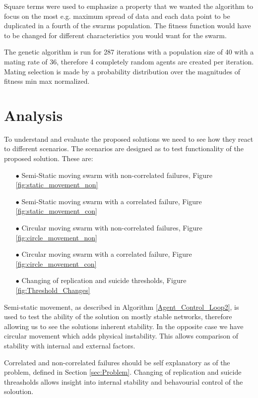 \documentclass{UoYCSproject}
\begin{document}
Square terms were used to emphasize a property that we wanted the algorithm to focus on the most e.g. maximum spread of data and each data point to be duplicated in a fourth of the swarms population. The fitness function would have to be changed for different characteristics you would want for the swarm.

The genetic algorithm is run for 287 iterations with a population size of 40 with a mating rate of 36, therefore 4 completely random agents are created per iteration. Mating selection is made by a probability distribution over the magnitudes of fitness min max normalized.




\chapter{Analysis}
\label{cha:Analysis}

To understand and evaluate the proposed solutions we need to see how they react to different scenarios. 
The scenarios are designed as to test functionality of the proposed solution. 
These are:

\begin{itemize}
\itemsep-1em
\item[$\bullet$] Semi-Static moving swarm with non-correlated failures, Figure \ref{fig:static_movement_non}
\item[$\bullet$] Semi-Static moving swarm with a correlated failure, Figure \ref{fig:static_movement_con}
\item[$\bullet$] Circular moving swarm with non-correlated failures, Figure \ref{fig:circle_movement_non}
\item[$\bullet$] Circular moving swarm with a correlated failure, Figure \ref{fig:circle_movement_con}
\item[$\bullet$] Changing of replication and suicide thresholds, Figure \ref{fig:Threshold_Changes}
\end{itemize}

Semi-static movement, as described in Algorithm \ref{Agent_Control_Loop2}, is used to test the ability of the solution on mostly stable networks, therefore allowing us to see the solutions inherent stability. 
In the opposite case we have circular movement which adds physical instability. 
This allows comparison of stability with internal and external factors.

Correlated and non-correlated failures should be self explanatory as of the problem, defined in Section \ref{sec:Problem}. 
Changing of replication and suicide threasholds allows insight into internal stability and behavourial control of the soloution.
\end{document}

